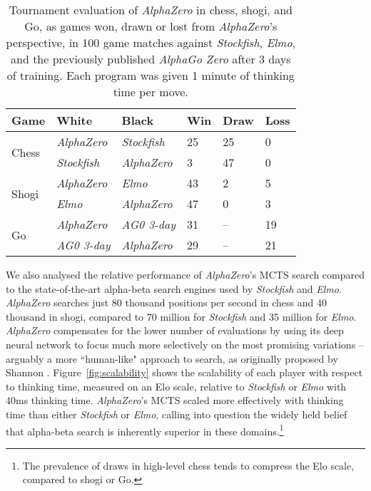 \documentclass[12pt]{article}
\begin{document}
\begin{table}
\begin{tabularx}{\textwidth}{XXX | XXX}
\toprule
Game & White & Black & Win & Draw & Loss \\
\midrule
\multirow{2}{*}{Chess} & \emph{AlphaZero} & \emph{Stockfish} & 25 & 25 & 0 \\
& \emph{Stockfish} & \emph{AlphaZero} & 3 & 47 & 0 \\
\midrule
\multirow{2}{*}{Shogi} & \emph{AlphaZero} & \emph{Elmo} & 43 & 2 & 5 \\
& \emph{Elmo} & \emph{AlphaZero} & 47 & 0 & 3 \\
\midrule
\multirow{2}{*}{Go} & \emph{AlphaZero} & \emph{AG0 3-day} & 31 & -- & 19 \\
& \emph{AG0 3-day} & \emph{AlphaZero} & 29 & -- & 21 \\ 
\bottomrule
\end{tabularx}
\caption{
\label{tab:results}
Tournament evaluation of \emph{AlphaZero} in chess, shogi, and Go, as games won, drawn or lost from \emph{AlphaZero}'s perspective, in 100 game matches against \emph{Stockfish}, \emph{Elmo}, and the previously published \emph{AlphaGo Zero} after 3 days of training. Each program was given 1 minute of thinking time per move. }
\end{table}

We also analysed the relative performance of \emph{AlphaZero}'s MCTS search compared to the state-of-the-art alpha-beta search engines used by \emph{Stockfish} and \emph{Elmo}. \emph{AlphaZero} searches just 80 thousand positions per second in chess and 40 thousand in shogi, compared to 70 million for \emph{Stockfish} and 35 million for \emph{Elmo}. \emph{AlphaZero} compensates for the lower number of evaluations by using its deep neural network to focus much more selectively on the most promising variations -- arguably a more ``human-like" approach to search, as originally proposed by Shannon \cite{shannon1950xxii}. Figure~\ref{fig:scalability} shows the scalability of each player with respect to thinking time, measured on an Elo scale, relative to \emph{Stockfish} or \emph{Elmo} with 40ms thinking time. \emph{AlphaZero}'s MCTS scaled more effectively with thinking time than either \emph{Stockfish} or \emph{Elmo}, calling into question the widely held belief \cite{arenz:mcc,david2016deepchess} that alpha-beta search is inherently superior in these domains.\footnote{The prevalence of draws in high-level chess tends to compress the Elo scale, compared to shogi or Go.}
\end{document}

